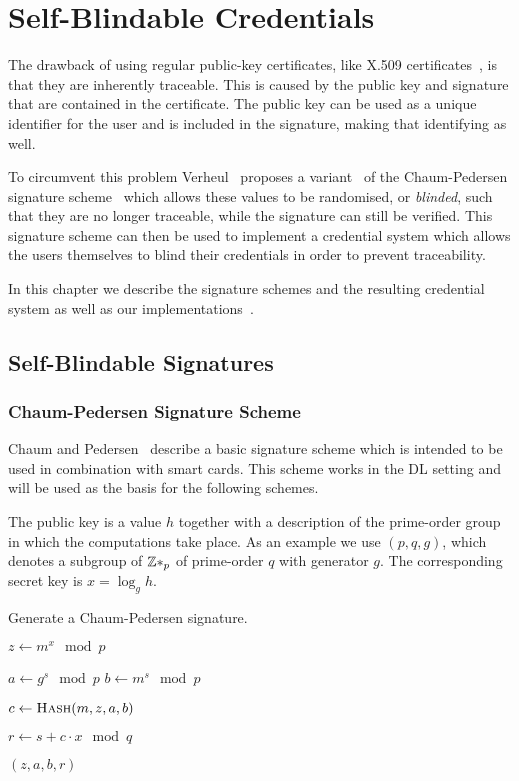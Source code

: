 \chapter{Self-Blindable Credentials}

The drawback of using regular public-key certificates, like X.509
certificates~\cite{ISO9594-8}, is that they are inherently traceable. This is
caused by the public key and signature that are contained in the certificate.
The public key can be used as a unique identifier for the user and is included
in the signature, making that identifying as well.

To circumvent this problem Verheul~\cite{Verheul01} proposes a
variant~\cite{BonehLS01,BonehLS04} of the Chaum-Pedersen signature
scheme~\cite{ChaumPedersen93} which allows these values to be randomised, or
\emph{blinded}, such that they are no longer traceable, while the signature can
still be verified. This signature scheme can then be used to implement a
credential system which allows the users themselves to blind their credentials
in order to prevent traceability.

In this chapter we describe the signature schemes and the resulting credential
system as well as our implementations~\cite{BatinaHJMV10,HoepmanJV10}.

\section{Self-Blindable Signatures}


\subsection{Chaum-Pedersen Signature Scheme}

Chaum and Pedersen~\cite{ChaumPedersen93} describe a basic signature scheme
which is intended to be used in combination with smart cards. This scheme works
in the DL setting and will be used as the basis for the following schemes.

The public key is a value $h$ together with a description of the prime-order
group in which the computations take place. As an example we use $(p, q, g)$,
which denotes a subgroup of $\mathbb{Z}*_p$ of prime-order $q$ with generator $g$. The
corresponding secret key is $x = \log_g h$.

\begin{algorithm}
  \caption{Generate a Chaum-Pedersen signature.}
  \label{alg:CP-sign}
  \addtolength{\baselineskip}{1mm}
  \begin{algorithmic}[1]
      \State $z \gets m^x \mod p$

      \State $a \gets g^s \mod p$
      \State $b \gets m^s \mod p$

      \State $c \gets \Call{Hash}{m, z, a, b}$

      \State $r \gets s + c \cdot x \mod q$

      \Return $(z, a, b, r)$
    \EndFunction
  \end{algorithmic}
\end{algorithm}

